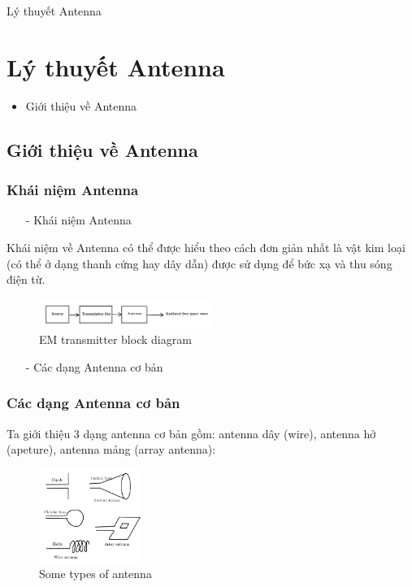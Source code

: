 \documentclass[8pt]{beamer}
\begin{document}
\begin{frame}{Lý thuyết Antenna}
\section{Lý thuyết Antenna}
\begin{itemize}
	\item Giới thiệu về Antenna
\end{itemize}
\subsection{ Giới thiệu về Antenna }
\subsubsection{Khái niệm Antenna}
\begin{itemize}
\item [-] Khái niệm Antenna
\end{itemize}
Khái niệm về Antenna có thể được hiểu theo cách đơn giản nhất là vật kim loại (có thể ở dạng thanh cứng hay dây dẫn) được sử dụng để bức xạ và thu sóng điện từ.
\begin{figure}[h]
			\includegraphics[width=0.5\textwidth]{block.jpg}
			\caption{EM transmitter block diagram}			\label{fig:re5}
\end{figure}
\begin{itemize}
	\item[-] Các dạng Antenna cơ bản
\end{itemize}
\subsubsection{Các dạng Antenna cơ bản}
Ta giới thiệu $3$ dạng antenna cơ bản gồm: antenna dây (wire), antenna hở (apeture), antenna mảng (array antenna):
\begin{figure}[h]
			\includegraphics[width=0.3\textwidth]{type.jpg}
			\caption{Some types of antenna}			\label{fig:re6}
\end{figure}

\end{frame}
\end{document}
